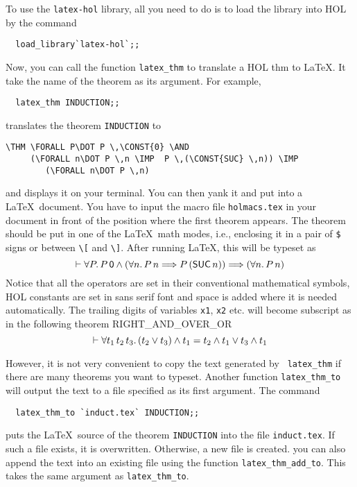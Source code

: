 To use the {\tt latex-hol} library, all you need to do is to load the
library into HOL by the command
\begin{verbatim}
  load_library`latex-hol`;;
\end{verbatim}
Now, you can call the function {\tt latex\_thm} to translate a HOL thm
to \LaTeX. It take the name of the theorem as its argument. For
example,
\begin{verbatim}
  latex_thm INDUCTION;;
\end{verbatim}
translates the theorem {\tt INDUCTION} to
\begin{verbatim}
\THM \FORALL P\DOT P \,\CONST{0} \AND 
     (\FORALL n\DOT P \,n \IMP  P \,(\CONST{SUC} \,n)) \IMP 
        (\FORALL n\DOT P \,n)
\end{verbatim}
and displays it on your terminal. You can then yank it and put into a
\LaTeX\ document. You have to input the macro file {\tt holmacs.tex} in
your document in front of the position where the first theorem
appears. The theorem should be put in one of the \LaTeX\ math
modes, i.e., enclosing it in a pair of {\tt \$} signs or between
\verb|\[| and \verb|\]|. After
running \LaTeX, this will be typeset as 
\[\THM \FORALL P\DOT P \,\CONST{0} \AND 
               (\FORALL n\DOT P \,n \IMP  P \,(\CONST{SUC} \,n)) \IMP 
                      (\FORALL n\DOT P \,n)
\]
Notice that all the operators are set in their conventional
mathematical symbols, HOL constants are set in {\constfont sans serif}
font and space is added where it is needed automatically.  The
trailing digits of variables {\tt x1}, {\tt x2} etc. will 
become subscript as in the following theorem RIGHT\_AND\_OVER\_OR
\[
\THM \FORALL t_{1} \,t_{2} \,t_{3}\DOT
        (t_{2} \OR  t_{3}) \AND  t_{1} =
           t_{2} \AND  t_{1} \OR  t_{3} \AND  t_{1}
\]

However, it is not very convenient to copy the text generated by {\tt
latex\_thm} if there are many theorems you want to typeset. Another
function {\tt latex\_thm\_to} will output the text to a file specified
as its first argument. The command
\begin{verbatim}
  latex_thm_to `induct.tex` INDUCTION;;
\end{verbatim}
puts the \LaTeX\ source of the theorem {\tt INDUCTION} into the file
{\tt induct.tex}. If such a file exists, it is overwritten. Otherwise,
a new file is created. you can also append the text into an existing
file using the function {\tt latex\_thm\_add\_to}. This takes the same
argument as {\tt latex\_thm\_to}.

